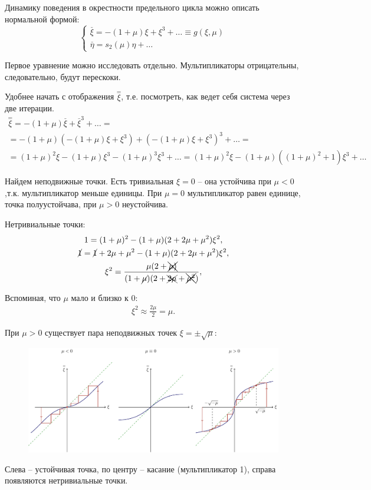 Динамику поведения в окрестности предельного цикла можно описать нормальной формой:
\begin{equation}
	\left\{\begin{aligned}
		\stackrel{\_}{\xi}= -(1+\mu)\xi+\xi^3+\dots \equiv g(\xi,\mu)\\
		\stackrel{\_}{\eta}= s_2(\mu)\eta+\dots
	\end{aligned}\right.
	\label{eq:110}	
\end{equation}

Первое уравнение можно исследовать отдельно. Мультипликаторы отрицательны, следовательно, будут перескоки. 

Удобнее начать с отображения $\stackrel{=}{\xi}$, т.е. посмотреть, как ведет себя система через две итерации.
\begin{gather*}
	\stackrel{=}{\xi}=-(1+\mu)\stackrel{\_}{\xi}+\stackrel{\_}{\xi}^3+\dots= \\
	=-(1+\mu)(-(1+\mu)\xi+\xi^3)+(-(1+\mu)\xi+\xi^3)^3+\dots= \\
	=(1+\mu)^2\xi-(1+\mu)\xi^3-(1+\mu)^3\xi^3+\dots=(1+\mu)^2\xi-(1+\mu)((1+\mu)^2+1)\xi^3+\dots
\end{gather*}


Найдем неподвижные точки. Есть тривиальная $\xi=0$ -- она устойчива при $\mu<0$,т.к. мультипликатор меньше единицы. При $\mu=0$ мультипликатор равен единице, точка полуустойчава, при $\mu>0$ неустойчива.

Нетривиальные точки:
\begin{gather*}
	1=(1+\mu)^2-(1+\mu)(2+2\mu+\mu^2)\xi^2, \\
	\cancel{1}=\cancel{1} +2\mu+\mu^2-(1+\mu)(2+2\mu+\mu^2)\xi^2, \\
	\xi^2=\frac{\mu(2+\xcancel{\mu)}}{(1+\cancel{\mu})(2+\xcancel{2\mu}+\xcancel{\mu^2})},
\end{gather*}

Вспоминая, что $\mu$ мало и близко к 0:
\begin{gather*}
	\xi^2 \approx \frac{2\mu}{2}=\mu.
\end{gather*}

При $\mu>0$ существует пара неподвижных точек $\xi=\pm \sqrt{\mu}$:
\begin{figure}[H]
	\centering
	\includegraphics[width=1\linewidth]{fig/fig68.pdf}   
\end{figure}
Слева -- устойчивая точка, по центру -- касание (мультипликатор 1), справа появляются нетривиальные точки.

